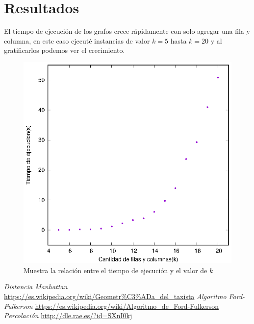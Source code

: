 \documentclass[12pt,letterpaper]{article}
\begin{document}
\section*{Resultados}
El tiempo de ejecución de los grafos crece rápidamente con solo agregar una fila y columna, en este caso ejecuté instancias de valor $k=5$ hasta $k=20$ y al gratificarlos podemos ver el crecimiento.

\begin{figure}[htbp]
\centering
\includegraphics[scale=1]{Resultados}
\caption{Muestra la relación entre el tiempo de ejecución y el valor de $k$}
\end{figure}

\begin{thebibliography}{a}
 \textit{Distancia Manhattan} \url{https://es.wikipedia.org/wiki/Geometr%C3%ADa_del_taxista}
 \textit{Algoritmo Ford-Fulkerson} \url{https://es.wikipedia.org/wiki/Algoritmo_de_Ford-Fulkerson}
 \textit{Percolación} \url{http://dle.rae.es/?id=SXnI0kj}
\end{thebibliography}
\end{document}
